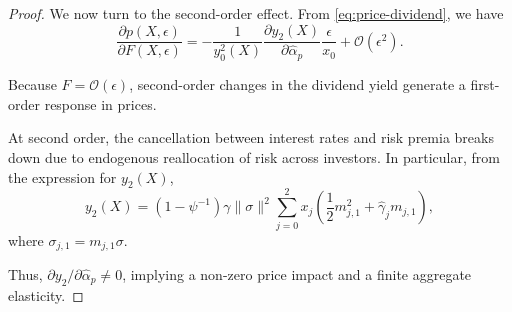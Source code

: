 \begin{proof}
We now turn to the second-order effect.
From \eqref{eq:price-dividend}, we have
\begin{equation}
\frac{\partial p(X,\epsilon)}{\partial F(X,\epsilon)}
=
-\frac{1}{y_0^2(X)}
\frac{\partial y_2(X)}{\partial \hat{\alpha}_p}
\frac{\epsilon}{x_0}
+ \mathcal{O}(\epsilon^2).
\end{equation}

Because $F = \mathcal{O}(\epsilon)$, second-order changes in the dividend yield generate a first-order response in prices.

At second order, the cancellation between interest rates and risk premia breaks down due to endogenous reallocation of risk across investors.
In particular, from the expression for $y_2(X)$,
\begin{equation}
    y_{2}(X)
    =
    (1-\psi^{-1})\gamma \|\sigma\|^2
    \sum_{j=0}^2 x_j
    \left(
        \frac{1}{2} m_{j,1}^2
        +
        \hat{\gamma}_j m_{j,1}
    \right),
\end{equation}
where $\sigma_{j,1} = m_{j,1}\sigma$.

Thus, $\partial y_2 / \partial \hat{\alpha}_p \neq 0$, implying a non-zero price impact and a finite aggregate elasticity.

\end{proof}

	

